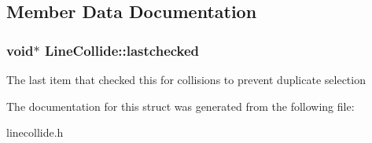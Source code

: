 \subsection{Member Data Documentation}
\subsubsection[{\texorpdfstring{lastchecked}{lastchecked}}]{\setlength{\rightskip}{0pt plus 5cm}void$\ast$ Line\+Collide\+::lastchecked}\hypertarget{structLineCollide_ad90845099647656b719f14a462044894}{}\label{structLineCollide_ad90845099647656b719f14a462044894}
The last item that checked this for collisions to prevent duplicate selection 

The documentation for this struct was generated from the following file\+:\begin{DoxyCompactItemize}
\item 
linecollide.\+h\end{DoxyCompactItemize}
